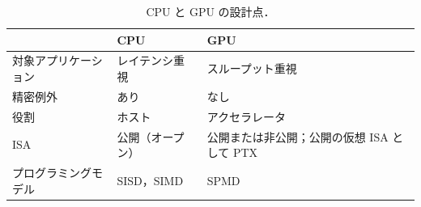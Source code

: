 \documentclass[../main.tex]{subfiles}
\begin{document}
\begin{table}[htbp]
  \centering
  \caption{CPU と GPU の設計点．}
  \label{tab:l01-cpu-gpu}
  \begin{tabular}{>{\raggedright\arraybackslash}p{36mm}
                  >{\raggedright\arraybackslash}p{36mm}
                  >{\raggedright\arraybackslash}p{36mm}}
    \toprule
    & CPU & GPU \\
    \midrule
    対象アプリケーション & レイテンシ重視 & スループット重視 \\
    精密例外 & あり & なし \\
    役割 & ホスト & アクセラレータ \\
    ISA & 公開（オープン） & 公開または非公開；公開の仮想 ISA として PTX \\
    プログラミングモデル & SISD，SIMD & SPMD \\
    \bottomrule
  \end{tabular}
\end{table}
\end{document}

